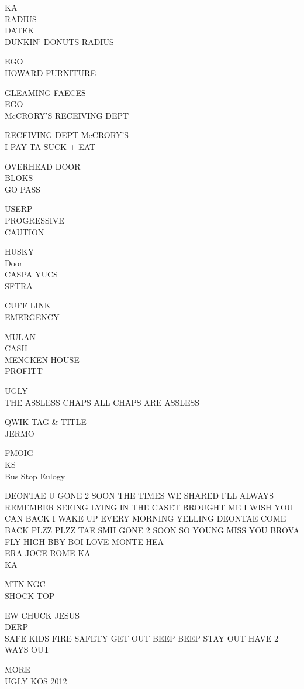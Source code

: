 \documentclass[10pt,letterpaper]{article}
\begin{document}
KA\\
RADIUS\\
DATEK\\
DUNKIN' DONUTS RADIUS

EGO\\
HOWARD FURNITURE

GLEAMING FAECES\\
EGO\\
McCRORY'S RECEIVING DEPT

RECEIVING DEPT McCRORY'S\\
I PAY TA SUCK + EAT

OVERHEAD DOOR\\
BLOKS\\
GO PASS

USERP\\
PROGRESSIVE\\
CAUTION

HUSKY\\
Door\\
CASPA YUCS\\
SFTRA

CUFF LINK\\
EMERGENCY

MULAN\\
CASH\\
MENCKEN HOUSE\\
PROFITT

UGLY\\
THE ASSLESS CHAPS ALL CHAPS ARE ASSLESS

QWIK TAG \& TITLE\\
JERMO

FMOIG\\
KS\\
Bus Stop Eulogy

DEONTAE U GONE 2 SOON THE TIMES WE SHARED I'LL ALWAYS REMEMBER SEEING LYING IN THE CASET BROUGHT ME I WISH YOU CAN BACK I WAKE UP EVERY MORNING YELLING DEONTAE COME BACK PLZZ PLZZ TAE SMH GONE 2 SOON SO YOUNG MISS YOU BROVA FLY HIGH BBY BOI LOVE MONTE HEA\\
ERA JOCE ROME KA\\
KA

MTN NGC\\
SHOCK TOP

EW CHUCK JESUS\\
DERP\\
SAFE KIDS FIRE SAFETY GET OUT BEEP BEEP STAY OUT HAVE 2 WAYS OUT

MORE\\
UGLY KOS 2012
\end{document}
